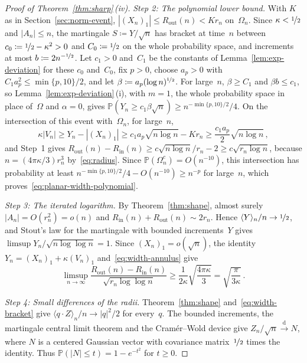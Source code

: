 \documentclass[11pt]{amsart}
\theoremstyle{plain}
\theoremstyle{definition}
\renewcommand{\P}{\mathbb P}
\newcommand{\drift}{\kappa}
\newcommand{\nf}{\nicefrac}
\newcommand{\Rin}{R_{\mathrm{in}}}
\newcommand{\Rout}{R_{\mathrm{out}}}
\numberwithin{equation}{section}
\begin{document}
\begin{proof}[Proof of Theorem~\ref{thm:sharp}\,\textup{(iv)}]
\emph{Step 2: The polynomial lower bound.} With $K$ as in Section~\ref{sec:norm-event}, $|(X_n)_1|\leq\Rout(n)<Kr_n$ on~$\Omega_n$. Since $\drift<\nf12$ and $|A_n|\leq n$, the martingale $S\coloneqq Y/\sqrt n$ has bracket at time~$n$ between $c_0\coloneqq\nf12-\drift^2>0$ and $C_0\coloneqq\nf12$ on the whole probability space, and increments at most $b\coloneqq2n^{-\nf12}$. Let $c_1>0$ and~$C_1$ be the constants of Lemma~\ref{lem:exp-deviation} for these $c_0$ and~$C_0$, fix $p>0$, choose $a_p>0$ with $C_1a_p^2\leq\min\{p,10\}/2$, and let $\beta\coloneqq a_p(\log n)^{\nf12}$. For large~$n$, $\beta\geq C_1$ and $\beta b\leq c_1$, so Lemma~\ref{lem:exp-deviation}\,(i), with $m=1$, the whole probability space in place of~$\Omega$ and $\alpha=0$, gives $\P(Y_n\geq c_1\beta\sqrt n)\geq n^{-\min\{p,10\}/2}/4$. On the intersection of this event with~$\Omega_n$, for large~$n$,
\begin{equation*}
\drift|V_n|\geq Y_n-|(X_n)_1|\geq c_1a_p\sqrt{n\log n}-Kr_n\geq\frac{c_1a_p}2\sqrt{n\log n}\, ,
\end{equation*}
and Step~1 gives $\Rout(n)-\Rin(n)\geq c\sqrt{n\log n}/r_n-2\geq c\sqrt{r_n\log n}$, because $n=(4\pi\drift/3)r_n^3$ by~\eqref{eq:radius}. Since $\P(\Omega_n^c)=O(n^{-10})$, this intersection has probability at least $n^{-\min\{p,10\}/2}/4-O(n^{-10})\geq n^{-p}$ for large~$n$, which proves~\eqref{eq:planar-width-polynomial}.

\emph{Step 3: The iterated logarithm.} By Theorem~\ref{thm:shape}, almost surely $|A_n|=O(r_n^2)=o(n)$ and $\Rin(n)+\Rout(n)\sim2r_n$. Hence $\langle Y\rangle_n/n\to\nf12$, and Stout's law for the martingale with bounded increments~$Y$ gives $\limsup Y_n/\sqrt{n\log\log n}=1$. Since $(X_n)_1=o(\sqrt n)$, the identity $Y_n=(X_n)_1+\drift(V_n)_1$ and~\eqref{eq:width-annulus} give
\begin{equation*}
\limsup_{n\to\infty}\frac{\Rout(n)-\Rin(n)}{\sqrt{r_n\log\log n}}
\geq\frac1{2\drift}\sqrt{\frac{4\pi\drift}{3}}
=\sqrt{\frac{\pi}{3\drift}}\, .
\end{equation*}

\emph{Step 4: Small differences of the radii.} Theorem~\ref{thm:shape} and~\eqref{eq:width-bracket} give $\langle q\cdot Z\rangle_n/n\to|q|^2/2$ for every~$q$. The bounded increments, the martingale central limit theorem and the Cram\'er--Wold device give $Z_n/\sqrt n\xrightarrow{\mathrm d}N$, where $N$ is a centered Gaussian vector with covariance matrix~$\nf12$ times the identity. Thus $\P(|N|\leq t)=1-e^{-t^2}$ for $t\geq0$.


\end{proof}
\end{document}
